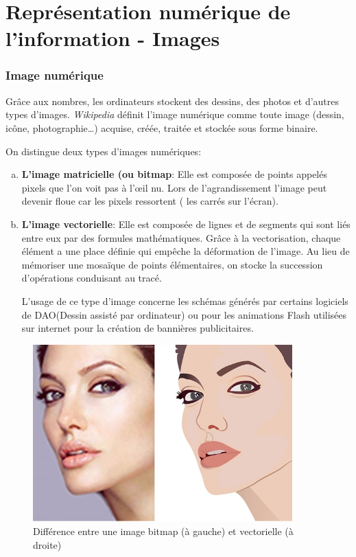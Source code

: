 \documentclass[11pt, a4paper]{book}
\begin{document}
\setcounter{chapter}{1}
\chapter{Représentation numérique de l’information - Images}

\subsection{Image numérique}

Grâce aux nombres, les ordinateurs stockent des dessins, des photos et d’autres types d’images.
{\it Wikipedia} définit l'image numérique  comme toute image (dessin, icône, photographie…) acquise, créée, traitée et stockée sous forme binaire.

On distingue deux types d’images numériques:
\begin{enumerate}[a)]
\item {\bf L'image matricielle (ou bitmap}:
Elle est composée de points appelés pixels que l’on voit pas à l'œil nu. Lors de l’agrandissement l’image peut devenir floue car les pixels ressortent ( les carrés sur l’écran).
\item {\bf L'image vectorielle}:
Elle est composée de lignes et de segments qui sont liés entre eux par des formules mathématiques. Grâce à la vectorisation, chaque élément a une place définie qui empêche la déformation de l’image. Au lieu de mémoriser une mosaïque de points élémentaires, on stocke la succession d’opérations conduisant au tracé.

L’usage de ce type d’image concerne les schémas générés par certains logiciels de DAO(Dessin assisté par ordinateur) ou pour les animations Flash utilisées sur internet pour la création de bannières publicitaires.

\end{enumerate}

\begin{center}
\begin{figure}
\centering
\includegraphics[width=10cm]{images/bitmapvectoriel}
\caption{Différence entre une image bitmap (à gauche) et vectorielle (à droite)}
\end{figure}
\end{center}
\end{document}
